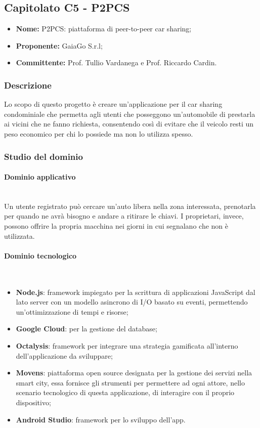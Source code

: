 \subsection{Capitolato C5 - P2PCS}
\begin{itemize}
\item \textbf{Nome:} P2PCS: piattaforma di peer-to-peer car sharing;
\item \textbf{Proponente:} GaiaGo S.r.l;
\item \textbf{Committente:} Prof. Tullio Vardanega e Prof. Riccardo Cardin.
\end{itemize}
\subsubsection{Descrizione}
Lo scopo di questo progetto è creare un'applicazione per il car sharing condominiale che permetta agli utenti che posseggono un'automobile di prestarla ai vicini che ne fanno richiesta, consentendo così di evitare che il veicolo resti un peso economico per chi lo possiede ma non lo utilizza spesso.

\subsubsection{Studio del dominio}
\paragraph{Dominio applicativo} \mbox{}\\
Un utente registrato può cercare un'auto libera nella zona interessata, prenotarla per quando ne avrà bisogno e andare a ritirare le chiavi. I proprietari, invece, possono offrire la propria macchina nei giorni in cui segnalano che non è utilizzata.

\paragraph{Dominio tecnologico} \mbox{}\\
\begin{itemize}
	\item \textbf{Node.js}: framework impiegato per la scrittura di applicazioni JavaScript dal lato server con un modello asincrono di I/O basato su eventi, permettendo un'ottimizzazione di tempi e risorse;
	\item \textbf{Google Cloud}: per la gestione del database;
	\item \textbf{Octalysis}: framework per integrare una strategia gamificata all'interno dell'applicazione da sviluppare;
	\item \textbf{Movens}: piattaforma open source designata per la gestione dei servizi nella smart city, essa fornisce gli strumenti per permettere ad ogni 
	attore, nello scenario tecnologico di questa applicazione, di interagire con il proprio dispositivo;
	\item \textbf{Android Studio}: framework per lo sviluppo dell'app.
\end{itemize}

